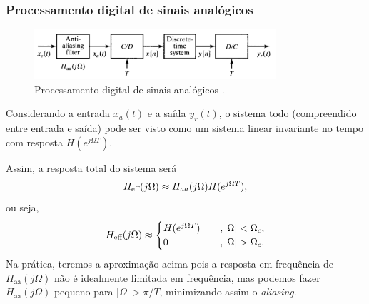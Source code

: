 \begin{frame}[allowframebreaks]
  \frametitle{Processamento digital de sinais analógicos}

  \begin{figure}[h!]
  \centering
  \includegraphics[width=0.8\textwidth]{images/oppenheim_fig442.png}
  \caption{Processamento digital de sinais analógicos \citep{oppenheim2009}.}
  \label{fig:oppenheim_fig442}
  \end{figure}


  Considerando a entrada $x_a(t)$ e a saída $y_r(t)$, o sistema todo (compreendido entre entrada e saída) 
  pode ser visto como um sistema linear invariante no tempo com resposta $H (e^{j \Omega T})$.

  Assim, a resposta total do sistema será
  \begin{equation}
  H_{\text{eff}} (j \Omega) \approx H_{aa} (j \Omega) H (e^{j \Omega T}) \textmd{,}
  \end{equation}
  ou seja,
  \begin{equation}
    H_{\text{eff}} (j \Omega) \approx \begin{cases} H(e^{j\Omega T}) \quad &, \vert \Omega \vert < \Omega_c,\\ 
                                   0 &, \vert \Omega \vert > \Omega_c \textmd{.} \end{cases}
  \end{equation}
  Na prática, teremos a aproximação acima pois 
  a resposta em frequência de $H_{\text{aa}} (j \Omega)$ não é idealmente limitada em frequência,
  mas podemos fazer $H_{\text{aa}} (j \Omega)$ pequeno para $\vert \Omega \vert > \pi / T$, minimizando assim 
  o \textit{aliasing}.
\end{frame} 

